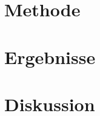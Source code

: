 \section{Methode}\label{sec:Methode}


\section{Ergebnisse}\label{sec:Ergebnisse}


\section{Diskussion}\label{sec:Diskussion}


\begin{flushleft}
\nocite{}
{}
\end{flushleft}






%
%
%